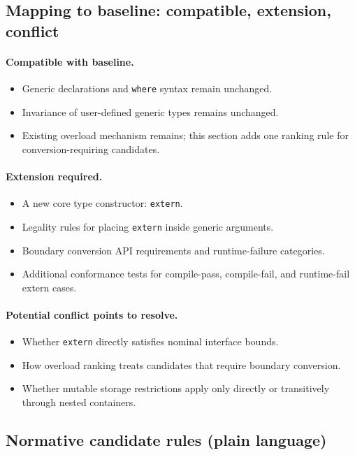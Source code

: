 \documentclass[11pt,a4paper]{article}
\begin{document}
\subsection{Mapping to baseline: compatible, extension, conflict}

\paragraph{Compatible with baseline.}
\begin{itemize}
  \item Generic declarations and \texttt{where} syntax remain unchanged.
  \item Invariance of user-defined generic types remains unchanged.
  \item Existing overload mechanism remains; this section adds one ranking rule for conversion-requiring candidates.
\end{itemize}

\paragraph{Extension required.}
\begin{itemize}
  \item A new core type constructor: \texttt{extern}.
  \item Legality rules for placing \texttt{extern} inside generic arguments.
  \item Boundary conversion API requirements and runtime-failure categories.
  \item Additional conformance tests for compile-pass, compile-fail, and runtime-fail extern cases.
\end{itemize}

\paragraph{Potential conflict points to resolve.}
\begin{itemize}
  \item Whether \texttt{extern} directly satisfies nominal interface bounds.
  \item How overload ranking treats candidates that require boundary conversion.
  \item Whether mutable storage restrictions apply only directly or transitively through nested containers.
\end{itemize}

\subsection{Normative candidate rules (plain language)}
\end{document}
